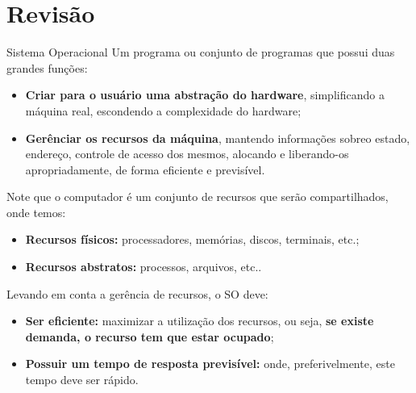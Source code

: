 \chapter{Revisão}

\begin{definicao}{Sistema Operacional}
  Um programa ou conjunto de programas que possui duas grandes funções:
  \begin{itemize}
    \item \textbf{Criar para o usuário uma abstração do hardware}, simplificando a máquina real, escondendo a complexidade do hardware;

    \item \textbf{Gerênciar os recursos da máquina}, mantendo informações sobreo estado, endereço, controle de acesso dos mesmos, alocando e liberando-os apropriadamente, de forma eficiente e previsível.
  \end{itemize}
\end{definicao}

Note que o computador é um conjunto de recursos que serão compartilhados, onde temos:
\begin{itemize}
  \item \textbf{Recursos físicos:} processadores, memórias, discos, terminais, etc.;

  \item \textbf{Recursos abstratos:} processos, arquivos, etc..
\end{itemize}

Levando em conta a gerência de recursos, o SO deve:
\begin{itemize}
  \item \textbf{Ser eficiente:} maximizar a utilização dos recursos, ou seja, \textbf{se existe demanda, o recurso tem que estar ocupado};

  \item \textbf{Possuir um tempo de resposta previsível:} onde, preferivelmente, este tempo deve ser rápido.
\end{itemize}















